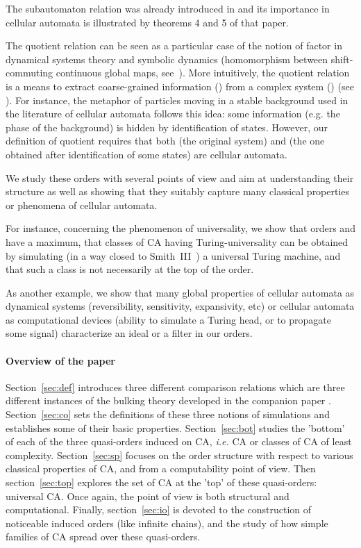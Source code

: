 \documentclass[a4paper]{elsarticle}
\begin{document}
The subautomaton relation was already introduced in \cite{bulking1}
and its importance in cellular automata is illustrated by theorems 4
and 5 of that paper. 

The quotient relation can be seen as a particular case of the notion
of factor in dynamical systems theory and symbolic dynamics
(homomorphism between shift-commuting continuous global maps,
see~\cite{LindMarcus}). More intuitively, the quotient relation is a
means to extract coarse-grained information () from a complex
system () (see \cite{physcoarsegrained}). For instance, the
metaphor of particles moving in a stable background used in the
literature of cellular automata\cite{Boccara} follows this idea: some
information (e.g. the phase of the background) is hidden by
identification of states. However, our definition of quotient requires
that both  (the original system) and  (the one obtained after
identification of some states) are cellular
automata. 



We study these orders with several points of view and aim at
understanding their structure as well as showing that they suitably
capture many classical properties or phenomena of cellular automata.

For instance, concerning the phenomenon of universality, we show that
orders  and  have a maximum, that classes
of CA having Turing-universality can be obtained by simulating (in a
way closed to Smith~III~\cite{Smith:1971:SCU}) a universal Turing
machine, and that such a class is not necessarily at the top of the
order.

As another example, we show that many global properties of cellular
automata as dynamical systems (reversibility, sensitivity,
expansivity, etc) or cellular automata as computational devices
(ability to simulate a Turing head, or to propagate some signal) characterize
an ideal or a filter in our orders.





\paragraph{Overview of the paper} Section~\ref{sec:def} introduces
three different comparison relations which are three different
instances of the bulking theory developed in the companion paper
\cite{bulking1}.  Section~\ref{sec:co} sets the definitions of these
three notions of simulations and establishes some of their basic
properties. Section~\ref{sec:bot} studies the 'bottom' of each of the
three quasi-orders induced on CA, \textit{i.e.} CA or classes of CA of
least complexity. Section~\ref{sec:sp} focuses on the order structure
with respect to various classical properties of CA, and from a
computability point of view. Then section~\ref{sec:top} explores the
set of CA at the 'top' of these quasi-orders: universal CA. Once
again, the point of view is both structural and computational.
Finally, section~\ref{sec:io} is devoted to the construction of
noticeable induced orders (like infinite chains), and the study of how
simple families of CA spread over these quasi-orders.
\end{document}
